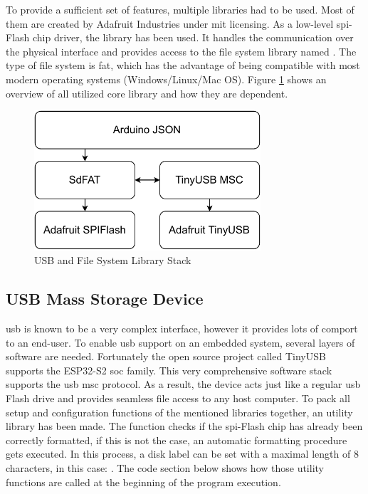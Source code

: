 To provide a sufficient set of features, multiple libraries had to be used. Most of them are created by Adafruit Industries under \acrshort{mit} licensing. \newline
As a low-level \acrshort{spi}-Flash chip driver, the  library has been used. It handles the communication over the physical interface and provides access to the file system library named  . The type of file system is \acrshort{fat}, which has the advantage of being compatible with most modern operating systems (Windows/Linux/Mac OS). Figure \ref{fig:file_system_stack} shows an overview of all utilized core library and how they are dependent.

\bigskip
\begin{figure}[h!]
	\centering
	\includegraphics[height=5.2cm]{images/file_system_stack.pdf}
	\caption{USB and File System Library Stack}
	\label{fig:file_system_stack}
\end{figure}
\newpage


\subsection{USB Mass Storage Device}
\acrshort{usb} is known to be a very complex interface, however it provides lots of comport to an end-user. To enable \acrshort{usb} support on an embedded system, several layers of software are needed. Fortunately the open source project called TinyUSB supports the ESP32-S2 \acrshort{soc} family. This very comprehensive software stack supports the \acrshort{usb} \acrfull{msc} protocol.
As a result, the device acts just like a regular \acrshort{usb} Flash drive and provides seamless file access to any host computer. \newline
To pack all setup and configuration functions of the mentioned libraries together, an utility library has been made. The  function checks if the \acrshort{spi}-Flash chip has already been correctly formatted, if this is not the case, an automatic formatting procedure gets executed. In this process, a disk label can be set with a maximal length of 8 characters, in this case: . The code section below shows how those utility functions are called at the beginning of the program execution.

